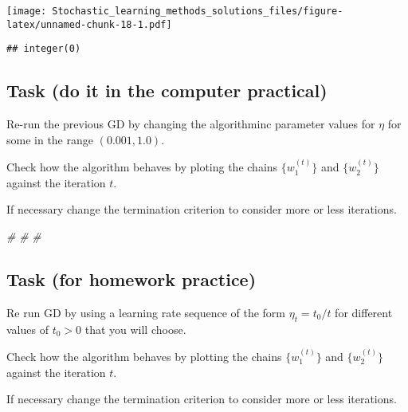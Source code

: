\documentclass[
]{article}
\newenvironment{Shaded}{\begin{snugshade}}{\end{snugshade}}
\newcommand{\CommentTok}[1]{\textcolor[rgb]{0.56,0.35,0.01}{\textit{#1}}}
\begin{document}
\texttt{[image: Stochastic\_learning\_methods\_solutions\_files/figure-latex/unnamed-chunk-18-1.pdf]}

\begin{verbatim}
## integer(0)
\end{verbatim}

\hypertarget{task-do-it-in-the-computer-practical-4}{%
\subsection{Task (do it in the computer
practical)}\label{task-do-it-in-the-computer-practical-4}}

Re-run the previous GD by changing the algorithminc parameter values for
\(\eta\) for some in the range \((0.001,1.0)\).

Check how the algorithm behaves by ploting the chains \(\{w_1^{(t)}\}\)
and \(\{w_2^{(t)}\}\) against the iteration \(t\).

If necessary change the termination criterion to consider more or less
iterations.

\begin{Shaded}
\begin{Highlighting}[]
\CommentTok{\#}
\CommentTok{\#}
\CommentTok{\#}
\end{Highlighting}
\end{Shaded}

\hypertarget{task-for-homework-practice}{%
\subsection{Task (for homework
practice)}\label{task-for-homework-practice}}

Re run GD by using a learning rate sequence of the form
\(\eta_t = t_0/t\) for different values of \(t_0>0\) that you will
choose.

Check how the algorithm behaves by plotting the chains \(\{w_1^{(t)}\}\)
and \(\{w_2^{(t)}\}\) against the iteration \(t\).

If necessary change the termination criterion to consider more or less
iterations.
\end{document}
